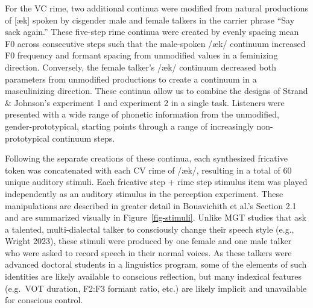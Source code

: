 \documentclass[
  letterpaper,
  DIV=11,
  numbers=noendperiod]{scrartcl}
\begin{document}
For the VC rime, two additional continua were modified from natural
productions of {[}æk{]} spoken by cisgender male and female talkers in
the carrier phrase ``Say sack again.'' These five-step rime continua
were created by evenly spacing mean F0 across consecutive steps such
that the male-spoken /æk/ continuum increased F0 frequency and formant
spacing from unmodified values in a feminizing direction. Conversely,
the female talker's /æk/ continuum decreased both parameters from
unmodified productions to create a continuum in a masculinizing
direction. These continua allow us to combine the designs of Strand \&
Johnson's experiment 1 and experiment 2 in a single task. Listeners were
presented with a wide range of phonetic information from the unmodified,
gender-prototypical, starting points through a range of increasingly
non-prototypical continuum steps.

Following the separate creations of these continua, each synthesized
fricative token was concatenated with each CV rime of /æk/, resulting in
a total of 60 unique auditory stimuli. Each fricative step + rime step
stimulus item was played independently as an auditory stimulus in the
perception experiment. These manipulations are described in greater
detail in Bouavichith et al.'s Section 2.1 and are summarized visually
in Figure~\ref{fig-stimuli}. Unlike MGT studies that ask a talented,
multi-dialectal talker to consciously change their speech style (e.g.,
Wright 2023), these stimuli were produced by one female and one male
talker who were asked to record speech in their normal voices. As these
talkers were advanced doctoral students in a linguistics program, some
of the elements of such identities are likely available to conscious
reflection, but many indexical features (e.g.~VOT duration, F2:F3
formant ratio, etc.) are likely implicit and unavailable for conscious
control.
\end{document}
